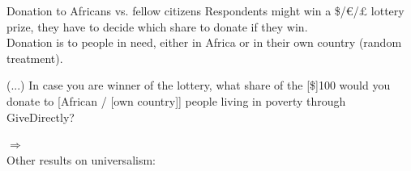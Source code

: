 \documentclass[aspectratio=169,xcolor=dvipsnames, 11pt,mathserif]{beamer}
\begin{document}
\begin{framefont}{\small}
\begin{frame}{Donation to Africans vs. fellow citizens\label{donation}}
	\bbvs \ip Respondents might win a \$/\euro{}/£ lottery prize, they have to decide which share to donate if they win. \\ Donation is to people in need, either in Africa or in their own country (random treatment).
    \ee \pause
    \begin{table}[h]\label{tab:donation}\vspace*{-.35cm}
        \caption{(...) In case you are winner of the lottery, what share of the [\$]100 would you donate to [African / [own country]] people living in poverty through GiveDirectly?} 
        \makebox[\textwidth][c]{}
      \end{table}
      $\Rightarrow$ 
      \\ Other results on universalism:  \hyperlink{prioritization}{} \hyperlink{negotiation}{} \hyperlink{group_defended}{} \hyperlink{problems}{}
\end{frame}




\end{framefont}
\end{document}
